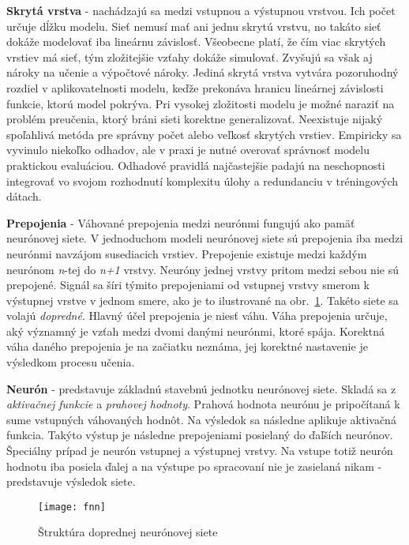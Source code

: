 \textbf{Skrytá vrstva} - nachádzajú sa medzi vstupnou a výstupnou vrstvou. Ich počet určuje dĺžku modelu. Sieť nemusí mať ani jednu skrytú vrstvu, no takáto sieť dokáže modelovať iba lineárnu závislosť. Všeobecne platí, že čím viac skrytých vrstiev má sieť, tým zložitejšie vzťahy dokáže simulovať. Zvyšujú sa však aj nároky na učenie a výpočtové nároky. Jediná skrytá vrstva vytvára pozoruhodný rozdiel v aplikovatelnosti modelu, keďže prekonáva hranicu lineárnej závislosti funkcie, ktorú model pokrýva. Pri vysokej zložitosti modelu je možné naraziť na problém preučenia, ktorý bráni sieti korektne generalizovať. Neexistuje nijaký spoľahlivá metóda pre správny počet alebo veľkosť skrytých vrstiev. Empiricky sa vyvinulo niekoľko odhadov, ale v praxi je nutné overovať správnosť modelu praktickou evaluáciou. Odhadové pravidlá najčastejšie padajú na neschopnosti integrovať vo svojom rozhodnutí komplexitu úlohy a redundanciu v tréningových dátach.
\noindent

\textbf{Prepojenia} - Váhované prepojenia medzi neurónmi fungujú ako pamäť neurónovej siete. V jednoduchom modeli neurónovej siete sú prepojenia iba medzi neurónmi navzájom susediacich vrstiev. Prepojenie existuje medzi každým neurónom \textit{n}-tej do \textit{n+1} vrstvy. Neuróny jednej vrstvy pritom medzi sebou nie sú prepojené. Signál sa šíri týmito prepojeniami od vstupnej vrstvy smerom k výstupnej vrstve v jednom smere, ako je to ilustrované na obr.~\ref{fig:fnn}. Takéto siete sa volajú \textit{dopredné}. Hlavný účel prepojenia je niesť váhu. Váha prepojenia určuje, aký významný je vzťah medzi dvomi danými neurónmi, ktoré spája. Korektná váha daného prepojenia je na začiatku neznáma, jej korektné nastavenie je výsledkom procesu učenia.
\noindent

\textbf{Neurón} - predstavuje základnú stavebnú jednotku neurónovej siete. Skladá sa z \textit{aktivačnej funkcie} a \textit{prahovej hodnoty}. Prahová hodnota neurónu je pripočítaná k sume vstupných váhovaných hodnôt. Na výsledok sa následne aplikuje aktivačná funkcia. Takýto výstup je následne prepojeniami posielaný do ďaľších neurónov. Špeciálny prípad je neurón vstupnej a výstupnej vrstvy. Na vstupe totiž neurón hodnotu iba posiela ďalej a na výstupe po spracovaní nie je zasielaná nikam - predstavuje výsledok siete.
\noindent


\begin{figure}[H]
\begin{center}\texttt{[image: fnn]}\end{center}
\caption[fnn]{Štruktúra doprednej neurónovej siete}\label{fig:fnn}
\end{figure}

